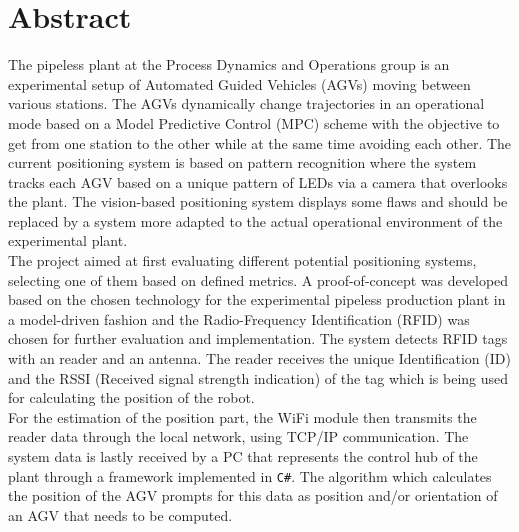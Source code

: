 \section*{Abstract} %

The pipeless plant at the Process Dynamics and Operations group is an experimental setup of Automated Guided Vehicles (AGVs) moving between various stations. The AGVs dynamically change trajectories in an operational mode based on a Model Predictive Control (MPC) scheme with the objective to get from one station to the other while at the same time avoiding each other. The current positioning system is based on pattern recognition where the system tracks each AGV based on a unique pattern of LEDs via a camera that overlooks the plant. The vision-based positioning system displays some flaws and should be replaced by a system more adapted to the actual operational environment of the experimental plant. \\

The project aimed at first evaluating different potential positioning systems, selecting one of them based on defined metrics. A proof-of-concept was developed based on the chosen technology for the experimental pipeless production plant in a model-driven fashion and the 
Radio-Frequency Identification (RFID) was chosen for further evaluation and implementation.
The system detects RFID tags with an reader and an antenna. The reader receives the unique Identification (ID)  and the RSSI (Received signal strength indication) of the tag which is being used for calculating the position of the robot. \\

For the estimation of the position part, the WiFi module then transmits the reader data through the local network, using TCP/IP communication. The system data is lastly received by a PC that represents the control hub of the plant through a framework implemented in \texttt{C\#}. The algorithm which calculates the position of the AGV prompts for this data as position and/or orientation of an AGV that needs to be computed. 

